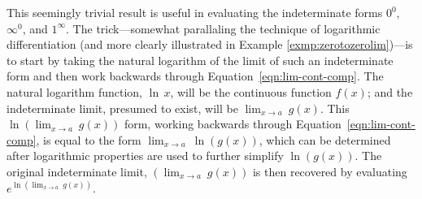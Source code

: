 
\noindent This seemingly trivial result is useful in evaluating the
indeterminate forms $0^0$, $\infty^0$, and $1^{\infty}$. The
trick---somewhat parallaling the technique of logarithmic
differentiation (and more clearly illustrated in Example
\ref{exmp:zerotozerolim})---is to start by taking the natural
logarithm of the limit of such an indeterminate form and then work
backwards through Equation~\ref{eqn:lim-cont-comp}. The natural
logarithm function, $\ln\,x$, will be the continuous function $f(x)$;
and the indeterminate limit, presumed to exist, will be $\displaystyle
\lim_{x \to a}~g(x)$. This $\displaystyle \ln\left(\lim_{x \to
  a}~g(x)\right)$ form, working backwards through
Equation~\ref{eqn:lim-cont-comp}, is equal to the form $\displaystyle
\lim_{x \to a}~\ln(g(x))$, which can be determined after logarithmic
properties are used to further simplify $\ln(g(x))$. The original
indeterminate limit, $\left(\lim_{x \to a}~g(x)\right)$ is then
recovered by evaluating $e^{\ln\left(\lim_{x \to
    a}~g(x)\right)}$. 

